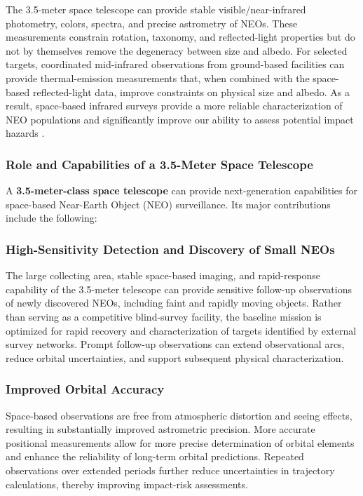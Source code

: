 The 3.5-meter space telescope can provide stable visible/near-infrared photometry, colors, spectra, and precise astrometry of NEOs. These measurements constrain rotation, taxonomy, and reflected-light properties but do not by themselves remove the degeneracy between size and albedo. For selected targets, coordinated mid-infrared observations from ground-based facilities can provide thermal-emission measurements that, when combined with the space-based reflected-light data, improve constraints on physical size and albedo.
As a result, space-based infrared surveys provide a more reliable characterization of NEO populations and significantly improve our ability to assess potential impact hazards \cite{mainzer2011}.


\subsubsection{Role and Capabilities of a 3.5-Meter Space Telescope}

A \textbf{3.5-meter-class space telescope} can provide next-generation capabilities for space-based Near-Earth Object (NEO) surveillance. Its major contributions include the following:

\subsubsection{High-Sensitivity Detection and Discovery of Small NEOs}\label{high-sensitivity-detection-and-discovery-of-small-neos}

The large collecting area, stable space-based imaging, and rapid-response capability of the 3.5-meter telescope can provide sensitive follow-up observations of newly discovered NEOs, including faint and rapidly moving objects. Rather than serving as a competitive blind-survey facility, the baseline mission is optimized for rapid recovery and characterization of targets identified by external survey networks. Prompt follow-up observations can extend observational arcs, reduce orbital uncertainties, and support subsequent physical characterization.

\subsubsection{Improved Orbital Accuracy}\label{improved-orbital-accuracy}

Space-based observations are free from atmospheric distortion and seeing effects, resulting in substantially improved astrometric precision. More accurate positional measurements allow for more precise determination of orbital elements and enhance the reliability of long-term orbital predictions. Repeated observations over extended periods further reduce uncertainties in trajectory calculations, thereby improving impact-risk assessments.

